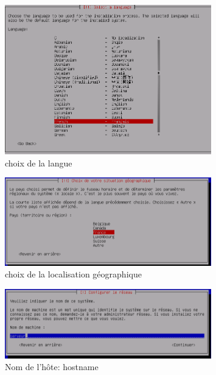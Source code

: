 \documentclass[11pt,a4paper,titlepage, oneside]{article}
\begin{document}
	\newpage		
		\begin{figure}[h]
                        \centering
                        \includegraphics[width=0.8\textwidth,natwidth=610,natheight=642]{images/debian2.png}
                        \caption{choix de la langue}
                \end{figure}
	\newpage
		\begin{figure}[h]
                        \centering
                        \includegraphics[width=0.8\textwidth,natwidth=610,natheight=642]{images/debian3.png}
                        \caption{choix de la localisation géographique}
                \end{figure}


	\newpage
                \begin{figure}[h]
                        \centering
                        \includegraphics[width=0.8\textwidth,natwidth=610,natheight=642]{images/debian4.png}
                        \caption{Nom de l'hôte: hostname}
                \end{figure}
\end{document}
